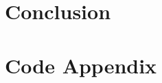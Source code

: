 \documentclass[12pt]{ucthesis}
\begin{document}
%

\chapter{Conclusion}\label{ch:Conclusion}





\setcounter{secnumdepth}{0}
\chapter*{Code Appendix}

\end{document}
